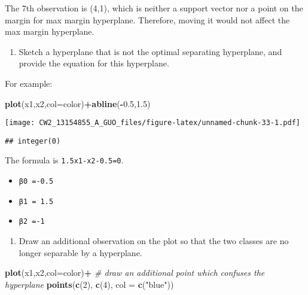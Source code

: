\documentclass[]{article}
\newenvironment{Shaded}{\begin{snugshade}}{\end{snugshade}}
\newcommand{\KeywordTok}[1]{\textcolor[rgb]{0.13,0.29,0.53}{\textbf{#1}}}
\newcommand{\DataTypeTok}[1]{\textcolor[rgb]{0.13,0.29,0.53}{#1}}
\newcommand{\DecValTok}[1]{\textcolor[rgb]{0.00,0.00,0.81}{#1}}
\newcommand{\FloatTok}[1]{\textcolor[rgb]{0.00,0.00,0.81}{#1}}
\newcommand{\StringTok}[1]{\textcolor[rgb]{0.31,0.60,0.02}{#1}}
\newcommand{\CommentTok}[1]{\textcolor[rgb]{0.56,0.35,0.01}{\textit{#1}}}
\newcommand{\OperatorTok}[1]{\textcolor[rgb]{0.81,0.36,0.00}{\textbf{#1}}}
\newcommand{\NormalTok}[1]{#1}
\providecommand{\tightlist}{%
  \setlength{\itemsep}{0pt}\setlength{\parskip}{0pt}}
\begin{document}
The 7th observation is (4,1), which is neither a support vector nor a
point on the margin for max margin hyperplane. Therefore, moving it
would not affect the max margin hyperplane.

\begin{enumerate}
\def\labelenumi{(\alph{enumi})}
\setcounter{enumi}{6}
\tightlist
\item
  Sketch a hyperplane that is not the optimal separating hyperplane, and
  provide the equation for this hyperplane.
\end{enumerate}

For example:

\begin{Shaded}
\begin{Highlighting}[]
\KeywordTok{plot}\NormalTok{(x1,x2,}\DataTypeTok{col=}\NormalTok{color)}\OperatorTok{+}\KeywordTok{abline}\NormalTok{(}\OperatorTok{-}\FloatTok{0.5}\NormalTok{,}\FloatTok{1.5}\NormalTok{)}
\end{Highlighting}
\end{Shaded}

\texttt{[image: CW2\_13154855\_A\_GUO\_files/figure-latex/unnamed-chunk-33-1.pdf]}

\begin{verbatim}
## integer(0)
\end{verbatim}

The formula is \texttt{1.5x1-x2-0.5=0}.

\begin{itemize}
\tightlist
\item
  \texttt{β0\ =-0.5}
\item
  \texttt{β1\ =\ 1.5}
\item
  \texttt{β2\ =-1}
\end{itemize}

\begin{enumerate}
\def\labelenumi{(\alph{enumi})}
\setcounter{enumi}{7}
\tightlist
\item
  Draw an additional observation on the plot so that the two classes are
  no longer separable by a hyperplane.
\end{enumerate}

\begin{Shaded}
\begin{Highlighting}[]
\KeywordTok{plot}\NormalTok{(x1,x2,}\DataTypeTok{col=}\NormalTok{color)}\OperatorTok{+}
\StringTok{        }\CommentTok{# draw an additional point which confuses the hyperplane}
\StringTok{        }\KeywordTok{points}\NormalTok{(}\KeywordTok{c}\NormalTok{(}\DecValTok{2}\NormalTok{), }\KeywordTok{c}\NormalTok{(}\DecValTok{4}\NormalTok{), }\DataTypeTok{col =} \KeywordTok{c}\NormalTok{(}\StringTok{"blue"}\NormalTok{))}
\end{Highlighting}
\end{Shaded}
\end{document}
